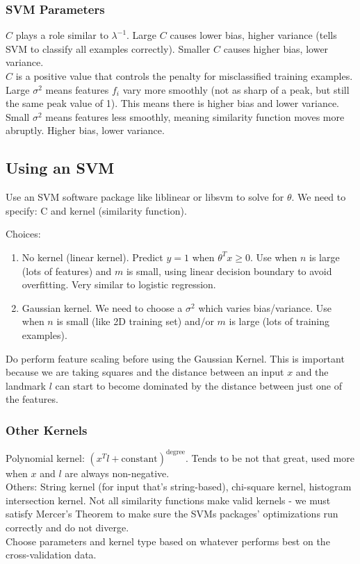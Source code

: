\documentclass[11pt,letterpaper]{article}
\begin{document}
\subsubsection{SVM Parameters}
$C$ plays a role similar to $\lambda^{-1}$. Large $C$ causes lower bias, higher variance (tells SVM to classify all examples correctly). Smaller $C$ causes higher bias, lower variance.\\ $C$ is a positive value that controls the penalty for misclassified training examples.
Large $\sigma^2$ means features $f_i$ vary more smoothly (not as sharp of a peak, but still the same peak value of 1). This means there is higher bias and lower variance. Small $\sigma^2$ means features less smoothly, meaning similarity function moves more abruptly. Higher bias, lower variance.

\subsection{Using an SVM}
Use an SVM software package like liblinear or libsvm to solve for $\theta$. We need to specify: C and kernel (similarity function).

Choices:
\begin{enumerate}
	\item No kernel (linear kernel). Predict $y = 1$ when $\theta^Tx \geq 0$. Use when $n$ is large (lots of features) and $m$ is small, using linear decision boundary to avoid overfitting. Very similar to logistic regression.
	\item Gaussian kernel. We need to choose a $\sigma^2$ which varies bias/variance. Use when $n$ is small (like 2D training set) and/or $m$ is large (lots of training examples).
\end{enumerate}
Do perform feature scaling before using the Gaussian Kernel. This is important because we are taking squares and the distance between an input $x$ and the landmark $l$ can start to become dominated by the distance between just one of the features.

\subsubsection{Other Kernels}
Polynomial kernel: $(x^Tl + \textrm{constant})^{\textrm{degree}}$. Tends to be not that great, used more when $x$ and $l$ are always non-negative.\\
Others: String kernel (for input that's string-based), chi-square kernel, histogram intersection kernel. Not all similarity functions make valid kernels - we must satisfy Mercer's Theorem to make sure the SVMs packages' optimizations run correctly and do not diverge.\\
Choose parameters and kernel type based on whatever performs best on the cross-validation data.
\end{document}
